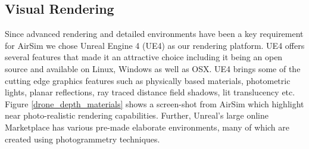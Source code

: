 \documentclass[graybox]{svmult}
\begin{document}
	\subsection{Visual Rendering}
	
	Since advanced rendering and detailed environments have been a key requirement for AirSim we chose Unreal Engine 4 (UE4) \cite{karis2013real} as our rendering platform. UE4 offers several features that made it an attractive choice including it being an open source and available on Linux, Windows as well as OSX. UE4 brings some of the cutting edge graphics features such as physically based materials, photometric lights, planar reflections, ray traced distance field shadows, lit translucency etc. Figure \ref{drone_depth_materials} shows a screen-shot from AirSim which highlight near photo-realistic rendering capabilities. Further, Unreal's large online Marketplace has various pre-made elaborate environments, many of which are created using photogrammetry techniques.
	
	
\end{document}
